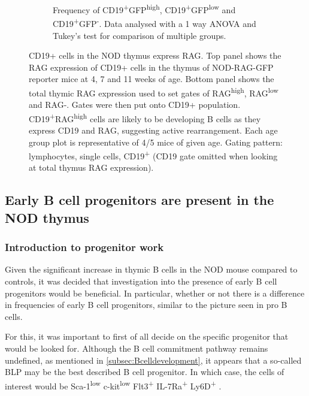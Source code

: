 \begin{figure}
\begin{subfigure}{\textwidth}
	\caption{Frequency of CD19\textsuperscript{+}GFP\textsuperscript{high}, CD19\textsuperscript{+}GFP\textsuperscript{low} and CD19\textsuperscript{+}GFP\textsuperscript{-}. Data analysed with a 1 way ANOVA and Tukey's test for comparison of multiple groups.}
	\label{subfig:RAGhighlowneggraph}
	\end{subfigure}
\caption{CD19+ cells in the NOD thymus express RAG. 
Top panel shows the RAG expression of CD19+ cells in the thymus of NOD-RAG-GFP reporter mice at 4, 7 and 11 weeks of age. Bottom panel shows the total thymic RAG expression used to set gates of RAG\textsuperscript{high}, RAG\textsuperscript{low} and RAG-. 
Gates were then put onto CD19+ population. 
CD19\textsuperscript{+}RAG\textsuperscript{high} cells are likely to be developing B cells as they express CD19 and RAG, suggesting active rearrangement. 
Each age group plot is representative of 4/5 mice of given age.
Gating pattern: lymphocytes, single cells, CD19\textsuperscript{+} (CD19 gate omitted when looking at total thymus RAG expression).}
\end{figure}



\subsection{Early B cell progenitors are present in the NOD thymus}
\label{subsec:earlyprogens}

\subsubsection{Introduction to progenitor work}

Given the significant increase in thymic B cells in the NOD mouse compared to controls, it was decided that investigation into the presence of early B cell progenitors would be beneficial.
In particular, whether or not there is a difference in frequencies of early B cell progenitors, similar to the picture seen in pro B cells.

For this, it was important to first of all decide on the specific progenitor that would be looked for.
Although the B cell commitment pathway remains undefined, as mentioned in \cref{subsec:Bcelldevelopment}, it appears that a so-called BLP may be the best described B cell progenitor.
In which case, the cells of interest would be Sca-1\textsuperscript{low} c-kit\textsuperscript{low} Flt3\textsuperscript{+} IL-7Ra\textsuperscript{+} Ly6D\textsuperscript{+} \citep{Mansson2010, Inlay2009, Zhang2013}.

